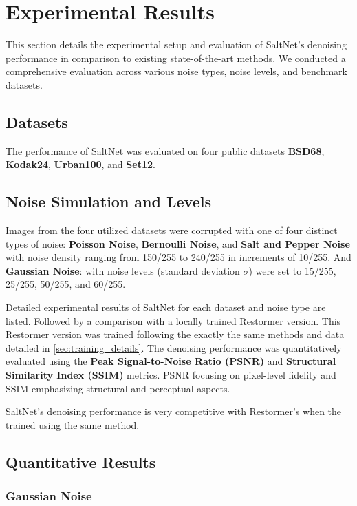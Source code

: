 \section*{Experimental Results}

This section details the experimental setup and evaluation of SaltNet's denoising performance in comparison to existing state-of-the-art methods. We conducted a comprehensive evaluation across various noise types, noise levels, and benchmark datasets.

\subsection{Datasets}

The performance of SaltNet was evaluated on four public datasets \textbf{BSD68}\cite{Martin01}, \textbf{Kodak24}\cite{Kodak}, \textbf{Urban100}\cite{Huang2015}, and \textbf{Set12}\cite{Set12}.

\subsection{Noise Simulation and Levels}

Images from the four utilized datasets were corrupted with one of four distinct types of noise: \textbf{Poisson Noise}, \textbf{Bernoulli Noise}, and \textbf{Salt and Pepper Noise} with noise density ranging from 150/255 to 240/255 in increments of 10/255. And \textbf{Gaussian Noise}: with noise levels (standard deviation $\sigma$) were set to 15/255, 25/255, 50/255, and 60/255.

Detailed experimental results of SaltNet for each dataset and noise type are listed. Followed by a comparison with a locally trained Restormer version. This Restormer version was trained following the exactly the same methods and data detailed in \ref{sec:training_details}. The denoising performance was quantitatively evaluated using the \textbf{Peak Signal-to-Noise Ratio (PSNR)} and \textbf{Structural Similarity Index (SSIM)} metrics. PSNR focusing on pixel-level fidelity and SSIM emphasizing structural and perceptual aspects.

SaltNet's denoising performance is very competitive with Restormer's when the trained using the same method.
\subsection{Quantitative Results}
\subsubsection{Gaussian Noise}


